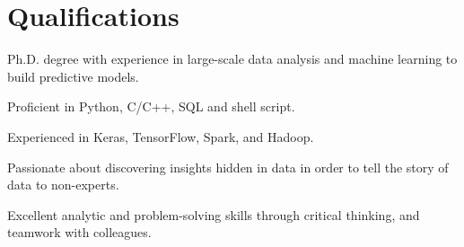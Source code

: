 \documentclass[letterpaper]{deedy-resume-openfont}
\begin{document}
\section{Qualifications}
\location{}
\vspace{-0.4cm}
\begin{tightemize}
\item Ph.D. degree with experience in large-scale data analysis and machine learning to build predictive models.
\item Proficient in Python, C/C++, SQL and shell script.
\item Experienced in Keras, TensorFlow, Spark, and Hadoop.
\item Passionate about discovering insights hidden in data in order to tell the story of data to non-experts.
\item Excellent analytic and problem-solving skills through critical thinking, and teamwork with colleagues.
\end{tightemize}

\end{document}
